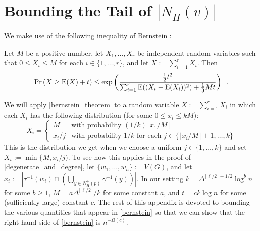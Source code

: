 \documentclass{patmorin}
\newcommand{\trn}{\chi_{\mathrm{us}}}
\begin{document}
%






\appendix

\section{Bounding the Tail of \boldmath$|N_H^+(v)|$}

We make use of the following inequality of Bernstein \cite[Corollary~2.11]{boucheron.lugosi.ea:concentration}:

\begin{thm}\label{bernstein_theorem}
  Let $M$ be a positive number, let $X_1,\ldots,X_r$ be independent random variables such that $0\le X_i\le M$ for each $i\in\{1,\ldots,r\}$, and let $X:=\sum_{i=1}^r X_i$. Then
  \begin{equation}
    \Pr\left(X \ge \mathrm{E}(X)+ t\right)
      \le \exp\left(\frac{\tfrac{1}{2}t^2}{\sum_{i=1}^r \mathrm{E}((X_i-\mathrm{E}(X_i))^2)+\tfrac{1}{3}Mt}\right) \enspace . \label{bernstein}
  \end{equation}
\end{thm}
We will apply \cref{bernstein_theorem} to a random variable $X:=\sum_{i=1}^r X_i$ in which each $X_i$ has the following distribution (for some $0\le x_i\le kM$):
\[
  X_i = \begin{cases}
          M & \text{with probability $(1/k)\lfloor x_1/M\rfloor$} \\
          x_i/j & \text{with probability $1/k$ for each $j\in\{\lfloor x_i/M\rfloor+1,\ldots,k\}$}
        \end{cases}
\]
This is the distribution we get when we choose a uniform $j\in\{1,\ldots,k\}$ and set $X_i:=\min\{M,x_i/j)$.  To see how this applies in the proof of \cref{degenerate_and_degree}, let $\{w_1,\ldots,w_n\}:=V(G)$, and let $x_i:=|\tau^{-1}(w_i)\cap\left(\bigcup_{y\in N^+_H(p)}\gamma^{-1}(y)\right)|$.  In our setting $k=\Delta^{\lfloor\ell/2\rfloor-1/2}\log^b n$ for some $b\ge 1$,  $M=a\Delta^{\lfloor\ell/2\rfloor}/k$ for some constant $a$, and $t=ck\log n$ for some (sufficiently large) constant $c$.  The rest of this appendix is devoted to bounding the various quantities that appear in \cref{bernstein} so that we can show that the right-hand side of \cref{bernstein} is $n^{-\Omega(c)}$.
\end{document}
